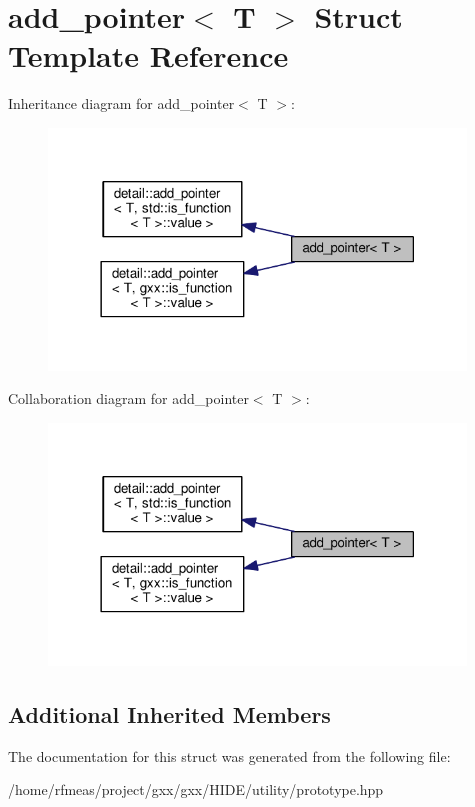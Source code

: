 \hypertarget{structadd__pointer}{}\section{add\+\_\+pointer$<$ T $>$ Struct Template Reference}
\label{structadd__pointer}


Inheritance diagram for add\+\_\+pointer$<$ T $>$\+:
\nopagebreak
\begin{figure}[H]
\begin{center}
\leavevmode
\includegraphics[width=314pt]{structadd__pointer__inherit__graph}
\end{center}
\end{figure}


Collaboration diagram for add\+\_\+pointer$<$ T $>$\+:
\nopagebreak
\begin{figure}[H]
\begin{center}
\leavevmode
\includegraphics[width=314pt]{structadd__pointer__coll__graph}
\end{center}
\end{figure}
\subsection*{Additional Inherited Members}


The documentation for this struct was generated from the following file\+:\begin{DoxyCompactItemize}
\item 
/home/rfmeas/project/gxx/gxx/\+H\+I\+D\+E/utility/prototype.\+hpp\end{DoxyCompactItemize}
